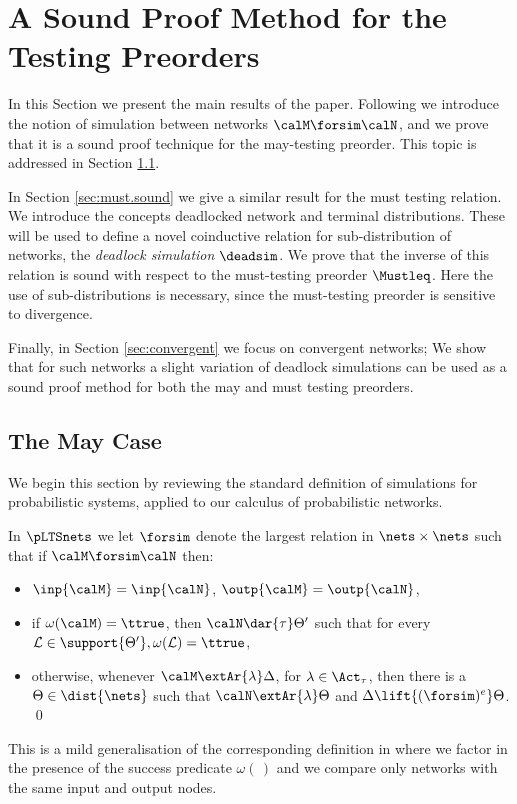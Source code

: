 \documentclass{LMCS}
\newcommand{\calL}{\ensuremath{{\mathcal{L}}}}
\begin{document}
\section{A Sound Proof Method for the Testing Preorders}

\label{sec:soundness}
In this Section we present the main results of the paper. 
Following \cite{DGHM09full} we introduce the notion of 
simulation between networks $\calM \forsim \calN$, and 
we prove that it is a sound proof technique for the 
may-testing preorder. This topic is addressed in Section 
\ref{sec:may.sound}.

In Section \ref{sec:must.sound} we give a similar 
result for the must testing relation. We introduce the 
concepts deadlocked network and terminal distributions. 
These will be used to define a novel coinductive 
relation for sub-distribution of networks, the \emph{deadlock 
simulation} $\deadsim$. We prove that the inverse of this 
relation is sound with respect to the must-testing preorder 
$\Mustleq$. Here the use of sub-distributions is necessary, 
since the must-testing preorder is sensitive to divergence.

Finally, in Section \ref{sec:convergent} we focus on convergent 
networks; We show that for such networks a slight 
variation of deadlock simulations can be used as 
a sound proof method for both the may and must testing 
preorders.

\subsection{The May Case}
\label{sec:may.sound}
We begin this section by reviewing the standard definition 
of simulations for probabilistic systems, applied to 
our calculus of probabilistic networks.
\begin{defi}\rm\label{def:sim}
In  $\pLTSnets$ we let 
 $\forsim$ denote the largest relation in $\nets\times \nets$
such that if $\calM \forsim \calN$ then:
\begin{itemize}
\item $\inp{\calM} = \inp{\calN}$, $\outp{\calM} = \outp{\calN}$,
\item 
if $\omega(\calM) = \ttrue$, then 
 $\calN \dar{\tau} \Theta'$ such that for every $\calL \in \support{\Theta'}, \omega(\calL) = \ttrue$,

\item otherwise, whenever $\calM \extAr{\lambda}\Delta$, for $\lambda \in \Act_\tau$, then
  there is a $\Theta \in \dist{\nets}$ such that 
  $\calN \extAr{\lambda}\Theta$ and $\Delta \lift{(\forsim)^e}\Theta$.
\qed
\end{itemize}


\end{defi}
\noindent
This is a mild generalisation of the corresponding definition in \cite{DGHM09full} where we factor in the 
presence of the success predicate $\omega(\,)$ and we compare only networks with the 
same input and output nodes. 
\end{document}
